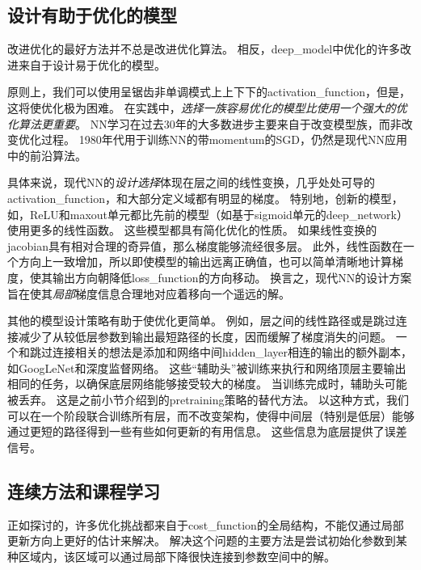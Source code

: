 
\subsection{设计有助于优化的模型}
\label{sec:designing_models_to_aid_optimization}
改进优化的最好方法并不总是改进优化算法。
相反，\gls{deep_model}中优化的许多改进来自于设计易于优化的模型。

原则上，我们可以使用呈锯齿非单调模式上上下下的\gls{activation_function}，但是，这将使优化极为困难。
在实践中，\emph{选择一族容易优化的模型比使用一个强大的优化算法更重要}。
\gls{NN}学习在过去30年的大多数进步主要来自于改变模型族，而非改变优化过程。
1980年代用于训练\gls{NN}的带\gls{momentum}的\gls{SGD}，仍然是现代\gls{NN}应用中的前沿算法。

具体来说，现代\gls{NN}的\emph{设计选择}体现在层之间的线性变换，几乎处处可导的\gls{activation_function}，和大部分定义域都有明显的梯度。
特别地，创新的模型，如，\gls{ReLU}和\gls{maxout}单元都比先前的模型（如基于\gls{sigmoid}单元的\gls{deep_network}）使用更多的线性函数。
这些模型都具有简化优化的性质。
如果线性变换的\gls{jacobian}具有相对合理的奇异值，那么梯度能够流经很多层。
此外，线性函数在一个方向上一致增加，所以即使模型的输出远离正确值，也可以简单清晰地计算梯度，使其输出方向朝降低\gls{loss_function}的方向移动。
换言之，现代\gls{NN}的设计方案旨在使其\emph{局部}梯度信息合理地对应着移向一个遥远的解。

其他的模型设计策略有助于使优化更简单。
例如，层之间的线性路径或是跳过连接减少了从较低层参数到输出最短路径的长度，因而缓解了梯度消失的问题\citep{Srivastava-et-al-arxiv2015}。
一个和跳过连接相关的想法是添加和网络中间\gls{hidden_layer}相连的输出的额外副本，如GoogLeNet\citep{Szegedy-et-al-arxiv2014}和深度监督网络\citep{Lee-et-al-2014}。
这些``辅助头''被训练来执行和网络顶层主要输出相同的任务，以确保底层网络能够接受较大的梯度。
当训练完成时，辅助头可能被丢弃。
这是之前小节介绍到的\gls{pretraining}策略的替代方法。
以这种方式，我们可以在一个阶段联合训练所有层，而不改变架构，使得中间层（特别是低层）能够通过更短的路径得到一些有些如何更新的有用信息。
这些信息为底层提供了误差信号。


\subsection{连续方法和课程学习}
\label{sec:continuation_methods_and_curriculum_learning}
正如探讨的，许多优化挑战都来自于\gls{cost_function}的全局结构，不能仅通过局部更新方向上更好的估计来解决。
解决这个问题的主要方法是尝试初始化参数到某种区域内，该区域可以通过局部下降很快连接到参数空间中的解。


